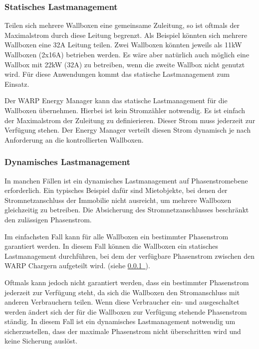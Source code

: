 \documentclass[a4paper,10pt]{article}
\newcommand*{\fullref}[1]{\hyperref[{#1}]{\ref*{#1}~\nameref*{#1}}}
\begin{document}
\begin{multicols*}{2}
	\subsubsection{Statisches Lastmanagement}
	\label{statisches_lastmanagement}

	Teilen sich mehrere Wallboxen eine gemeinsame Zuleitung, so ist oftmals der
	Maximalstrom durch diese Leitung begrenzt. Als Beispiel könnten sich mehrere
	Wallboxen eine 32A Leitung teilen. Zwei Wallboxen könnten jeweils als 11kW
	Wallboxen (2x16A) betrieben werden. Es wäre aber natürlich auch möglich eine
	Wallbox mit 22kW (32A) zu betreiben, wenn die zweite Wallbox nicht genutzt
	wird. Für diese Anwendungen kommt das statische Lastmanagement zum Einsatz.

	Der WARP Energy Manager kann das statische Lastmanagement für die Wallboxen
	übernehmen. Hierbei ist kein Stromzähler notwendig. Es ist einfach der
	Maximalstrom der Zuleitung zu definierieren. Dieser Strom muss jederzeit zur
	Verfügung stehen. Der Energy Manager verteilt diesen Strom dynamisch
	je nach Anforderung an die kontrollierten Wallboxen.

	\subsubsection{Dynamisches Lastmanagement}
	\label{dynamisches_lastmanagement}

	In manchen Fällen ist ein dynamisches Lastmanagement auf Phasenstromebene erforderlich.
	Ein typisches Beispiel dafür sind Mietobjekte, bei denen der Stromnetzanschluss der
	Immobilie nicht ausreicht, um mehrere Wallboxen gleichzeitig zu betreiben.
	Die Absicherung des Stromnetzanschlusses beschränkt den zulässigen Phasenstrom.

	Im einfachsten Fall kann für alle Wallboxen ein bestimmter Phasenstrom garantiert werden.
	In diesem Fall können die Wallboxen ein statisches Lastmanagement durchführen,
	bei dem der verfügbare Phasenstrom zwischen den WARP Chargern aufgeteilt wird. (siehe \fullref{statisches_lastmanagement}).

	Oftmals kann jedoch nicht garantiert werden, dass ein bestimmter Phasenstrom jederzeit
	zur Verfügung steht, da sich die Wallboxen den Stromanschluss mit anderen Verbrauchern teilen.
	Wenn diese Verbraucher ein- und ausgeschaltet werden
	ändert sich der für die Wallboxen zur Verfügung stehende Phasenstrom
	ständig. In diesem Fall ist ein dynamisches Lastmanagement notwendig um
	sicherzustellen, dass der maximale Phasenstrom nicht überschritten wird und
	keine Sicherung auslöst. 


\end{multicols*}
\end{document}
